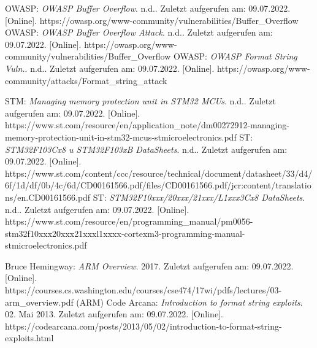 \documentclass[a4paper,
DIV=13,
12pt,
BCOR=10mm,
department=FakIM,
oneside,
parskip=half,
automark,
listof=totocnumbered,
bibliography=totocnumbered,
acronym=totocnumbered
] {OTHRartcl}
\begin{document}
\begin{appendix}
\begin{thebibliography}{99}
  OWASP: \textit{OWASP Buffer Overflow}. n.d.. Zuletzt aufgerufen am: 09.07.2022. [Online]. https://owasp.org/www-community/vulnerabilities/Buffer\_Overflow
  OWASP: \textit{OWASP Buffer Overflow Attack}. n.d.. Zuletzt aufgerufen am: 09.07.2022. [Online]. https://owasp.org/www-community/vulnerabilities/Buffer\_Overflow
  OWASP: \textit{OWASP Format String Vuln.}. n.d.. Zuletzt aufgerufen am: 09.07.2022. [Online]. https://owasp.org/www-community/attacks/Format\_string\_attack

  STM: \textit{Managing memory protection unit in STM32 MCUs}. n.d.. Zuletzt aufgerufen am: 09.07.2022. [Online]. https://www.st.com/resource/en/application\_note/dm00272912-managing-memory-protection-unit-in-stm32-mcus-stmicroelectronics.pdf
  ST: \textit{STM32F103Cx8 u STM32F103xB DataSheets}. n.d.. Zuletzt aufgerufen am: 09.07.2022. [Online]. https://www.st.com/content/ccc/resource/technical/document/datasheet/33/d4/6f/1d/df/0b/4c/6d/CD00161566.pdf/files/CD00161566.pdf/jcr:content/translations/en.CD00161566.pdf
  ST: \textit{STM32F10xxx/20xxx/21xxx/L1xxx3Cx8 DataSheets}. n.d.. Zuletzt aufgerufen am: 09.07.2022. [Online]. https://www.st.com/resource/en/programming\_manual/pm0056-stm32f10xxx20xxx21xxxl1xxxx-cortexm3-programming-manual-stmicroelectronics.pdf

  Bruce Hemingway: \textit{ARM Overview}. 2017. Zuletzt aufgerufen am: 09.07.2022. [Online]. https://courses.cs.washington.edu/courses/cse474/17wi/pdfs/lectures/03-arm\_overview.pdf (ARM)
  Code Arcana: \textit{Introduction to format string exploits}. 02. Mai 2013. Zuletzt aufgerufen am: 09.07.2022. [Online]. https://codearcana.com/posts/2013/05/02/introduction-to-format-string-exploits.html


\end{thebibliography}
\end{appendix}
\end{document}
